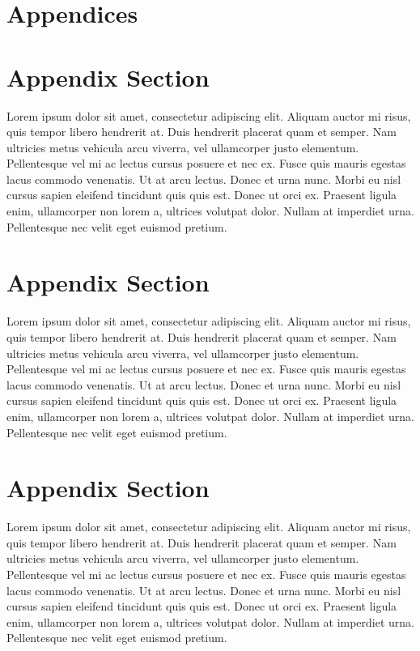 \documentclass[
	a4paper, %
	12pt, %
]{CSSullivanBusinessReport}
\begin{document}
\newpage

\section*{Appendices}

\begin{appendices}

\section{Appendix Section}

Lorem ipsum dolor sit amet, consectetur adipiscing elit. Aliquam auctor mi risus, quis tempor libero hendrerit at. Duis hendrerit placerat quam et semper. Nam ultricies metus vehicula arcu viverra, vel ullamcorper justo elementum. Pellentesque vel mi ac lectus cursus posuere et nec ex. Fusce quis mauris egestas lacus commodo venenatis. Ut at arcu lectus. Donec et urna nunc. Morbi eu nisl cursus sapien eleifend tincidunt quis quis est. Donec ut orci ex. Praesent ligula enim, ullamcorper non lorem a, ultrices volutpat dolor. Nullam at imperdiet urna. Pellentesque nec velit eget euismod pretium.

\section{Appendix Section}

Lorem ipsum dolor sit amet, consectetur adipiscing elit. Aliquam auctor mi risus, quis tempor libero hendrerit at. Duis hendrerit placerat quam et semper. Nam ultricies metus vehicula arcu viverra, vel ullamcorper justo elementum. Pellentesque vel mi ac lectus cursus posuere et nec ex. Fusce quis mauris egestas lacus commodo venenatis. Ut at arcu lectus. Donec et urna nunc. Morbi eu nisl cursus sapien eleifend tincidunt quis quis est. Donec ut orci ex. Praesent ligula enim, ullamcorper non lorem a, ultrices volutpat dolor. Nullam at imperdiet urna. Pellentesque nec velit eget euismod pretium.

\section{Appendix Section}

Lorem ipsum dolor sit amet, consectetur adipiscing elit. Aliquam auctor mi risus, quis tempor libero hendrerit at. Duis hendrerit placerat quam et semper. Nam ultricies metus vehicula arcu viverra, vel ullamcorper justo elementum. Pellentesque vel mi ac lectus cursus posuere et nec ex. Fusce quis mauris egestas lacus commodo venenatis. Ut at arcu lectus. Donec et urna nunc. Morbi eu nisl cursus sapien eleifend tincidunt quis quis est. Donec ut orci ex. Praesent ligula enim, ullamcorper non lorem a, ultrices volutpat dolor. Nullam at imperdiet urna. Pellentesque nec velit eget euismod pretium.

\end{appendices}

\end{document}
